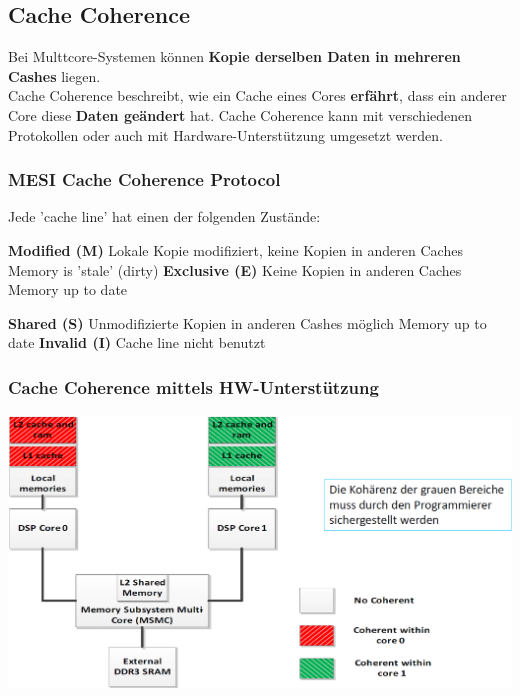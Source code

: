 \subsection{Cache Coherence}

Bei Multtcore-Systemen können \textbf{Kopie derselben Daten in mehreren Cashes} liegen. \\
Cache Coherence beschreibt, wie ein Cache eines Cores \textbf{erfährt}, dass ein anderer Core diese \textbf{Daten geändert} hat. 
Cache Coherence kann mit verschiedenen Protokollen oder auch mit Hardware-Unterstützung umgesetzt werden.


\subsubsection{MESI Cache Coherence Protocol}

Jede 'cache line' hat einen der folgenden Zustände:

\vspace{0.1cm}

\begin{minipage}[t]{0.48\columnwidth}
    \raggedright
    \begin{outline}
        \1 \textbf{Modified (M)}
            \2 Lokale Kopie modifiziert, keine Kopien in anderen Caches
            \2 Memory is 'stale' (dirty)
        \1 \textbf{Exclusive (E)}
            \2 Keine Kopien in anderen Caches
            \2 Memory up to date
    \end{outline}
\end{minipage}
\hfill
\begin{minipage}[t]{0.48\columnwidth}
    \raggedright
    \begin{outline}
        \1 \textbf{Shared (S)}
            \2 Unmodifizierte Kopien in anderen Cashes möglich
            \2 Memory up to date
        \1 \textbf{Invalid (I)}
            \2 Cache line nicht benutzt
    \end{outline}
\end{minipage}


\subsubsection{Cache Coherence mittels HW-Unterstützung}

\includegraphics[width=\columnwidth]{images/multicore_cache_coherence_HW.png}


